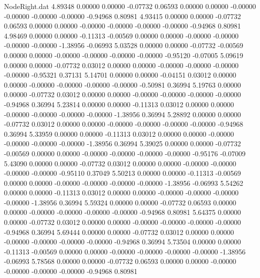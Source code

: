 \begin{filecontents}{NodeRight.dat}
   4.89348    0.00000    0.00000    -0.07732    0.06593    0.00000    0.00000   -0.00000   -0.00000   -0.00000   -0.00000   -0.94968    0.80981
   4.93415    0.00000    0.00000    -0.07732    0.06593    0.00000    0.00000   -0.00000   -0.00000   -0.00000   -0.00000   -0.94968    0.80981
   4.98469    0.00000    0.00000    -0.11313   -0.00569    0.00000    0.00000   -0.00000   -0.00000   -0.00000   -0.00000   -1.38956   -0.06993
   5.03528    0.00000    0.00000    -0.07732   -0.00569    0.00000    0.00000   -0.00000   -0.00000   -0.00000   -0.00000   -0.95120   -0.07005
   5.09619    0.00000    0.00000    -0.07732    0.03012    0.00000    0.00000   -0.00000   -0.00000   -0.00000   -0.00000   -0.95321    0.37131
   5.14701    0.00000    0.00000    -0.04151    0.03012    0.00000    0.00000   -0.00000   -0.00000   -0.00000   -0.00000   -0.50981    0.36994
   5.19763    0.00000    0.00000    -0.07732    0.03012    0.00000    0.00000   -0.00000   -0.00000   -0.00000   -0.00000   -0.94968    0.36994
   5.23814    0.00000    0.00000    -0.11313    0.03012    0.00000    0.00000   -0.00000   -0.00000   -0.00000   -0.00000   -1.38956    0.36994
   5.28892    0.00000    0.00000    -0.07732    0.03012    0.00000    0.00000   -0.00000   -0.00000   -0.00000   -0.00000   -0.94968    0.36994
   5.33959    0.00000    0.00000    -0.11313    0.03012    0.00000    0.00000   -0.00000   -0.00000   -0.00000   -0.00000   -1.38956    0.36994
   5.39025    0.00000    0.00000    -0.07732   -0.00569    0.00000    0.00000   -0.00000   -0.00000   -0.00000   -0.00000   -0.95176   -0.07009
   5.43090    0.00000    0.00000    -0.07732    0.03012    0.00000    0.00000   -0.00000   -0.00000   -0.00000   -0.00000   -0.95110    0.37049
   5.50213    0.00000    0.00000    -0.11313   -0.00569    0.00000    0.00000   -0.00000   -0.00000   -0.00000   -0.00000   -1.38956   -0.06993
   5.54262    0.00000    0.00000    -0.11313    0.03012    0.00000    0.00000   -0.00000   -0.00000   -0.00000   -0.00000   -1.38956    0.36994
   5.59324    0.00000    0.00000    -0.07732    0.06593    0.00000    0.00000   -0.00000   -0.00000   -0.00000   -0.00000   -0.94968    0.80981
   5.64375    0.00000    0.00000    -0.07732    0.03012    0.00000    0.00000   -0.00000   -0.00000   -0.00000   -0.00000   -0.94968    0.36994
   5.69444    0.00000    0.00000    -0.07732    0.03012    0.00000    0.00000   -0.00000   -0.00000   -0.00000   -0.00000   -0.94968    0.36994
   5.73504    0.00000    0.00000    -0.11313   -0.00569    0.00000    0.00000   -0.00000   -0.00000   -0.00000   -0.00000   -1.38956   -0.06993
   5.78568    0.00000    0.00000    -0.07732    0.06593    0.00000    0.00000   -0.00000   -0.00000   -0.00000   -0.00000   -0.94968    0.80981

\end{filecontents}
